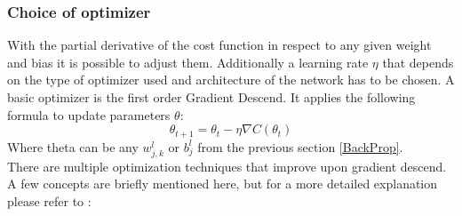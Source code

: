 			\subsubsection{Choice of optimizer}
				With the partial derivative of the cost function in respect to any given weight and bias it is possible to adjust them. Additionally a learning rate $\eta$ that depends on the type of optimizer used and architecture of the network has to be chosen. A basic optimizer is the first order Gradient Descend. It applies the following formula to update parameters $\theta$:
				\begin{equation}
					\theta_{t+1}=\theta_t - \eta \nabla C(\theta_t)
					\label{EQ:GD}
				\end{equation}
				Where theta can be any $w^l_{j,k}$ or $b^l_j$ from the previous section \ref{BackProp}.\\
				There are multiple optimization techniques that improve upon gradient descend. A few concepts are briefly mentioned here, but for a more detailed explanation please refer to :
